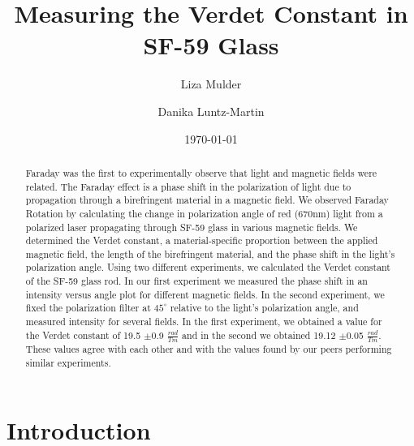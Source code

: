 \documentclass[prb,preprint]{revtex4-1}
\begin{document}

\title{Measuring the Verdet Constant in SF-59 Glass}


\author{Liza Mulder}


\author{Danika Luntz-Martin}


\date{\today}



\begin{abstract}

Faraday was the first to experimentally observe that light and magnetic fields were related. The Faraday effect is a phase shift in the polarization of light due to propagation through a birefringent material in a magnetic field. We observed Faraday Rotation by calculating the change in polarization angle of red (670nm) light from a polarized laser propagating through SF-59 glass in various magnetic fields. We determined the Verdet constant, a material-specific proportion between the applied magnetic field, the length of the birefringent material, and the phase shift in the light's polarization angle. Using two different experiments, we calculated the Verdet constant of the SF-59 glass rod. In our first experiment we measured the phase shift in an intensity versus angle plot for different magnetic fields.  In the second experiment, we fixed the polarization filter at $45^{\circ}$ relative to the light's polarization angle, and measured intensity for several fields. In the first experiment, we obtained a value for the Verdet constant of 19.5 $\pm$0.9 $\frac{rad}{Tm}$ and in the second we obtained 19.12 $\pm$0.05 $\frac{rad}{Tm}$. These values agree with each other and with the values found by our peers performing similar experiments. 

\end{abstract}

\maketitle %


\section{Introduction} %
\end{document}
